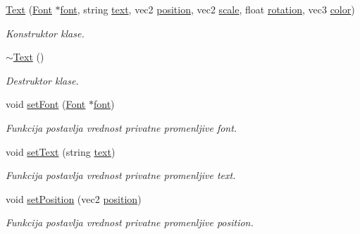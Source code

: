 \begin{DoxyCompactItemize}
\item 
\hyperlink{classfont_1_1Text_ab5d3ba772a694bed6c4aae538d78f4a2}{Text} (\hyperlink{classfont_1_1Font}{Font} $\ast$\hyperlink{classfont_1_1Text_abcaa4524d10d18e780ff793cca49a168}{font}, string \hyperlink{classfont_1_1Text_aee63974ff23d9e971bbd04fe041ccb07}{text}, vec2 \hyperlink{classfont_1_1Text_a65489ce0d1c13aaf242804987dba8b8d}{position}, vec2 \hyperlink{classfont_1_1Text_aec4f985d466d9f4b10cc426e393d6f14}{scale}, float \hyperlink{classfont_1_1Text_a4dc0a823fa5a8592b6d09e90b18226fb}{rotation}, vec3 \hyperlink{classfont_1_1Text_a83c69eadc420a466aaade60393f35b24}{color})
\begin{DoxyCompactList}\small\item\em Konstruktor klase. \end{DoxyCompactList}\item 
\hyperlink{classfont_1_1Text_a50beaa869e82f58675eec45b8b9a292d}{$\sim$\+Text} ()
\begin{DoxyCompactList}\small\item\em Destruktor klase. \end{DoxyCompactList}\item 
void \hyperlink{classfont_1_1Text_a0011424ac1cb959e601463e48c8e58dd}{set\+Font} (\hyperlink{classfont_1_1Font}{Font} $\ast$\hyperlink{classfont_1_1Text_abcaa4524d10d18e780ff793cca49a168}{font})
\begin{DoxyCompactList}\small\item\em Funkcija postavlja vrednost privatne promenljive font. \end{DoxyCompactList}\item 
void \hyperlink{classfont_1_1Text_a3eae0fce16f5ea89ae3b0fae55cf3e93}{set\+Text} (string \hyperlink{classfont_1_1Text_aee63974ff23d9e971bbd04fe041ccb07}{text})
\begin{DoxyCompactList}\small\item\em Funkcija postavlja vrednost privatne promenljive text. \end{DoxyCompactList}\item 
void \hyperlink{classfont_1_1Text_adf4bb1e9486fcb905ec62a6ad776dbde}{set\+Position} (vec2 \hyperlink{classfont_1_1Text_a65489ce0d1c13aaf242804987dba8b8d}{position})
\begin{DoxyCompactList}\small\item\em Funkcija postavlja vrednost privatne promenljive position. \end{DoxyCompactList}\item 

\end{DoxyCompactItemize}
